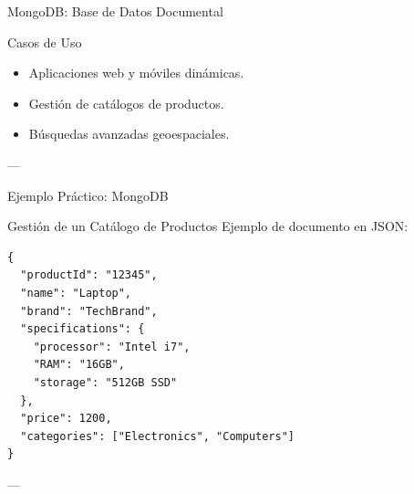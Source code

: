 \documentclass[presentation]{beamer}
\begin{document}
\begin{frame}[label={sec:org2994fa3}]{MongoDB: Base de Datos Documental}
\begin{block}{Casos de Uso}
\begin{itemize}
\item Aplicaciones web y móviles dinámicas.
\item Gestión de catálogos de productos.
\item Búsquedas avanzadas geoespaciales.
\end{itemize}

---
\end{block}
\end{frame}

\begin{frame}[label={sec:org652cd06},fragile]{Ejemplo Práctico: MongoDB}
 \begin{block}{Gestión de un Catálogo de Productos}
Ejemplo de documento en JSON:
\begin{verbatim}
{
  "productId": "12345",
  "name": "Laptop",
  "brand": "TechBrand",
  "specifications": {
    "processor": "Intel i7",
    "RAM": "16GB",
    "storage": "512GB SSD"
  },
  "price": 1200,
  "categories": ["Electronics", "Computers"]
}
\end{verbatim}

---
\end{block}
\end{frame}
\end{document}
